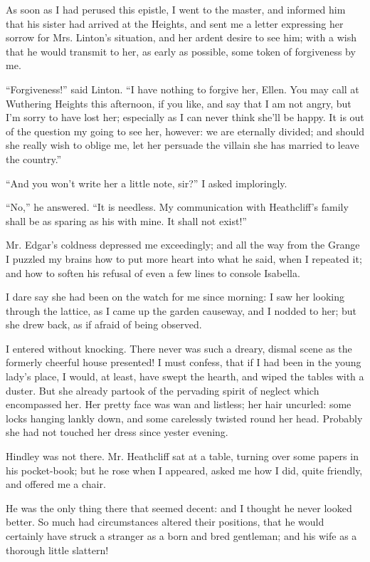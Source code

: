 \par As soon as I had perused this epistle, I went to the master, and informed him that his sister had arrived at the Heights, and sent me a letter expressing her sorrow for Mrs. Linton's situation, and her ardent desire to see him; with a wish that he would transmit to her, as early as possible, some token of forgiveness by me.
\par “Forgiveness!” said Linton. “I have nothing to forgive her, Ellen. You may call at Wuthering Heights this afternoon, if you like, and say that I am not angry, but I'm sorry to have lost her; especially as I can never think she'll be happy. It is out of the question my going to see her, however: we are eternally divided; and should she really wish to oblige me, let her persuade the villain she has married to leave the country.”
\par “And you won't write her a little note, sir?” I asked imploringly.
\par “No,” he answered. “It is needless. My communication with Heathcliff's family shall be as sparing as his with mine. It shall not exist!”
\par Mr. Edgar's coldness depressed me exceedingly; and all the way from the Grange I puzzled my brains how to put more heart into what he said, when I repeated it; and how to soften his refusal of even a few lines to console Isabella.
\par I dare say she had been on the watch for me since morning: I saw her looking through the lattice, as I came up the garden causeway, and I nodded to her; but she drew back, as if afraid of being observed.
\par I entered without knocking. There never was such a dreary, dismal scene as the formerly cheerful house presented! I must confess, that if I had been in the young lady's place, I would, at least, have swept the hearth, and wiped the tables with a duster. But she already partook of the pervading spirit of neglect which encompassed her. Her pretty face was wan and listless; her hair uncurled: some locks hanging lankly down, and some carelessly twisted round her head. Probably she had not touched her dress since yester evening.
\par Hindley was not there. Mr. Heathcliff sat at a table, turning over some papers in his pocket-book; but he rose when I appeared, asked me how I did, quite friendly, and offered me a chair.
\par He was the only thing there that seemed decent: and I thought he never looked better. So much had circumstances altered their positions, that he would certainly have struck a stranger as a born and bred gentleman; and his wife as a thorough little slattern!
